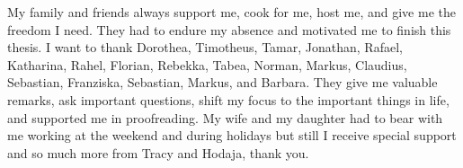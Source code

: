 My family and friends always support me, cook for me, host me, and give me the freedom I need.
They had to endure my absence and motivated me to finish this thesis.
I want to thank Dorothea, Timotheus, Tamar, Jonathan, Rafael, Katharina, Rahel, Florian, Rebekka, Tabea, Norman, Markus, Claudius, Sebastian, Franziska, Sebastian, Markus, and Barbara.
They give me valuable remarks, ask important questions, shift my focus to the important things in life, and supported me in proofreading.
My wife and my daughter had to bear with me working at the weekend and during holidays but still I receive special support and so much more from Tracy and Hodaja, thank you.

\clearpage
\renewcommand\pagemark{\usekomafont{pagenumber}\thepage}
\setcounter{tocdepth}{1}
\tableofcontents

